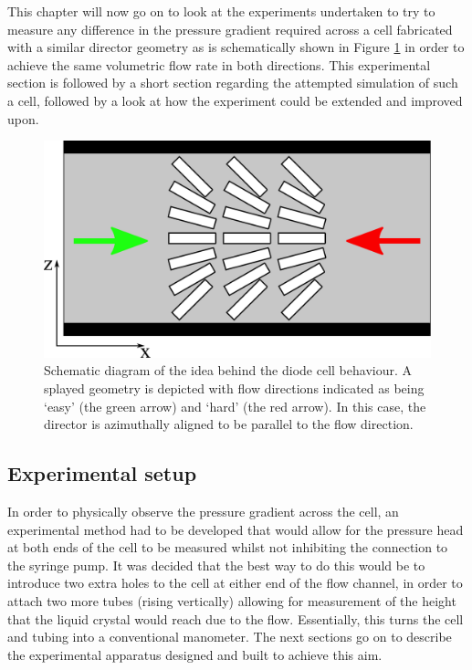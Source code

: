 This chapter will now go on to look at the experiments undertaken to try to measure any difference in the pressure gradient required across a cell fabricated with a similar director geometry as is schematically shown in Figure \ref{fig:schematic_diode} in order to achieve the same volumetric flow rate in both directions. This experimental section is followed by a short section regarding the attempted simulation of such a cell, followed by a look at how the experiment could be extended and improved upon.

\begin{figure}
\begin{center}
\includegraphics{Figures/Diode/schematic_diode}
\end{center}
\caption[Schematic diagram of a splayed `diode' cell]{\label{fig:schematic_diode}Schematic diagram of the idea behind the diode cell behaviour. A splayed geometry is depicted with flow directions indicated as being `easy' (the green arrow) and `hard' (the red arrow). In this case, the director is azimuthally aligned to be parallel to the flow direction.}
\end{figure}

\subsection{Experimental setup}
\label{sec:experimental_deets}
In order to physically observe the pressure gradient across the cell, an experimental method had to be developed that would allow for the pressure head at both ends of the cell to be measured whilst not inhibiting the connection to the syringe pump. It was decided that the best way to do this would be to introduce two extra holes to the cell at either end of the flow channel, in order to attach two more tubes (rising vertically) allowing for measurement of the height that the liquid crystal would reach due to the flow. Essentially, this turns the cell and tubing into a conventional manometer. The next sections go on to describe the experimental apparatus designed and built to achieve this aim.

